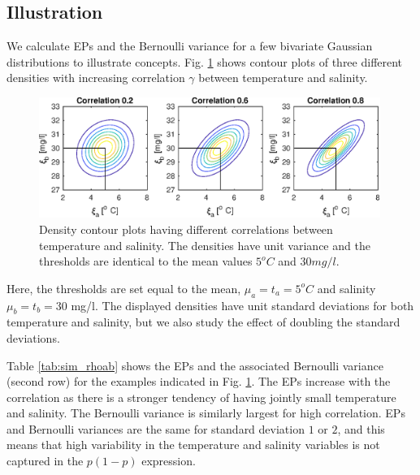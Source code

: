 \documentclass[aoas]{imsart}
\begin{document}
\subsection{Illustration}

We calculate EPs and the Bernoulli variance for a few bivariate Gaussian distributions to illustrate concepts. 
Fig. \ref{illus_bivarDens}
shows contour plots of three different densities with increasing correlation $\gamma$ between temperature and salinity. 
\begin{figure}[h!] \centering
  \includegraphics[width=0.99\textwidth]{Figures/illus_bivar.eps}
  \caption{Density contour plots having different correlations between
    temperature and salinity. The densities have unit variance and the thresholds are identical to the mean values $5^o C$ and $30 mg/l$.}\label{illus_bivarDens} 
\end{figure}
Here, the thresholds are set equal to the mean, $\mu_a=t_a=5^o C$ and salinity $\mu_b=t_b=30$ mg/l. The displayed densities have unit standard deviations for both temperature and salinity, but we also study the effect of doubling the standard deviations. 

Table \ref{tab:sim_rhoab} shows the EPs and the associated Bernoulli variance (second row) for the examples indicated in Fig. \ref{illus_bivarDens}. The EPs increase with the correlation as there is a stronger tendency of having jointly small temperature and salinity. The Bernoulli variance is similarly largest for high correlation. EPs and Bernoulli variances are the same for standard deviation $1$ or $2$, and this means that high variability in the temperature and salinity variables is not captured in the $p(1-p)$ expression.
\end{document}
